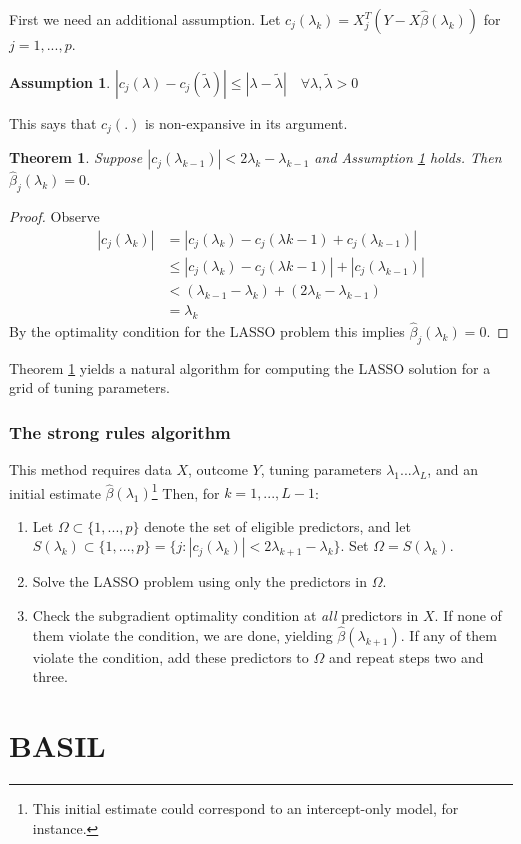 \documentclass{amsart}
\newtheorem{assumption}{Assumption}
\newtheorem{theorem}{Theorem}
\begin{document}
\bigskip

First we need an additional assumption. Let $c_j(\lambda_k) = X_j^T(Y -
X\hat{\beta}(\lambda_k))$ for $j = 1, ..., p$. 

\begin{assumption}\label{a1}
$|c_j(\lambda) - c_j(\tilde{\lambda})| \leq |\lambda - \tilde{\lambda}| \quad
\forall \lambda, \tilde{\lambda} > 0$
\end{assumption}

This says that $c_j(.)$ is non-expansive in its argument.

\begin{theorem}\label{t1}
	Suppose $|c_j(\lambda_{k-1})| < 2\lambda_k - \lambda_{k-1}$ and
	Assumption \ref{a1} holds. Then $\hat{\beta}_j(\lambda_k) = 0$. 
\end{theorem}

\begin{proof}
	Observe
	\begin{align*}
		|c_j(\lambda_k)| &= |c_j(\lambda_k) - c_j(\lambda{k-1}) + c_j(\lambda_{k-1})| \\
		&\leq |c_j(\lambda_k) - c_j(\lambda{k-1})| + |c_j(\lambda_{k-1})| \\
		&< (\lambda_{k-1} - \lambda_k) + (2\lambda_k - \lambda_{k-1}) \\
		&= \lambda_k
	\end{align*}	
	By the optimality condition for the LASSO problem this implies
	$\hat{\beta}_j(\lambda_k) = 0$. 
\end{proof}

Theorem \ref{t1} yields a natural algorithm for computing the LASSO solution for
a grid of tuning parameters.

\subsubsection{The strong rules algorithm}

This method requires data $X$, outcome $Y$, tuning parameters $\lambda_1 ...
\lambda_L$, and an initial estimate $\hat{\beta}(\lambda_1)$\footnote{This
initial estimate could correspond to an intercept-only model, for instance.}
Then, for $k = 1, ..., L-1$:

\begin{enumerate}[I]
	\item Let $\Omega \subset \{1, ..., p\}$ denote the set of eligible predictors, and
	let $S(\lambda_k) \subset \{1,...,p\} = \{j : |c_j(\lambda_k)| <
	2\lambda_{k+1} - \lambda_k \}$. Set $\Omega = S(\lambda_k)$. 
	\item Solve the LASSO problem using only the predictors in $\Omega$. 
	\item Check the subgradient optimality condition at \textit{all}
	predictors in $X$. If none of them violate the condition, we are done, yielding $\hat{\beta}(\lambda_{k+1})$. If any of them violate the condition, add these
	predictors to $\Omega$ and repeat steps two and three.
\end{enumerate}


\section{BASIL}




\end{document}
